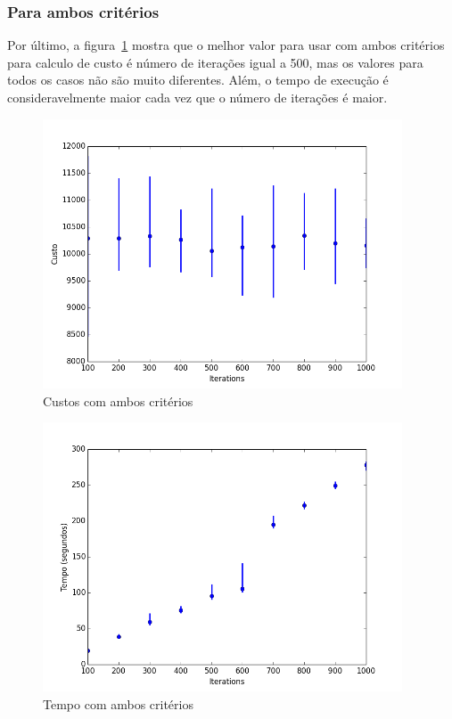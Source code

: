 	
	\subsubsection{Para ambos critérios}
		Por último, a figura~\ref{fig:costbothiterations} mostra que o melhor valor para usar com ambos critérios para calculo de custo é número de iterações igual a 500, mas os valores para todos os casos não são muito diferentes. Além, o tempo de execução é consideravelmente maior cada vez que o número de iterações é maior.
		\begin{figure}[H]
			\centering
			\includegraphics[height=8cm]{images/cost_both_iterations}
			\caption{Custos com ambos critérios}
			\label{fig:costbothiterations}
		\end{figure}
		
		\begin{figure}[H]
			\centering
			\includegraphics[height=8cm]{images/time_both_iterations}
			\caption{Tempo com ambos critérios}
			\label{fig:timebothiterations}
		\end{figure}